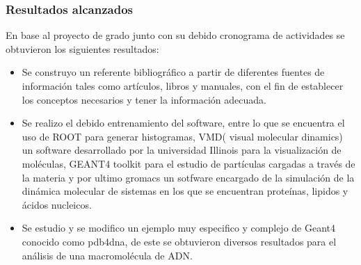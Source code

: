 \subsubsection{Resultados alcanzados}
En base al proyecto de grado junto con su debido cronograma de actividades se obtuvieron los siguientes resultados:
\begin{itemize}
  \item Se construyo un referente bibliográfico
a partir de diferentes fuentes de información tales como
artículos, libros y manuales, con el fin de establecer los conceptos necesarios y tener la información adecuada.
\item Se realizo el debido entrenamiento del software, entre lo que se encuentra el uso de ROOT para generar histogramas, VMD( visual molecular dinamics) un software desarrollado por la universidad Illinois para la visualización de moléculas, GEANT4 toolkit para el estudio de partículas cargadas a través de la materia y por ultimo gromacs un sotfware encargado de la simulación de la dinámica molecular de sistemas en los que se encuentran proteínas, lipidos y ácidos nucleicos.
\item Se estudio y se modifico un ejemplo muy especifico y complejo de Geant4 conocido como pdb4dna, de este se obtuvieron diversos resultados para el análisis de una macromolécula de ADN.
\end{itemize}
